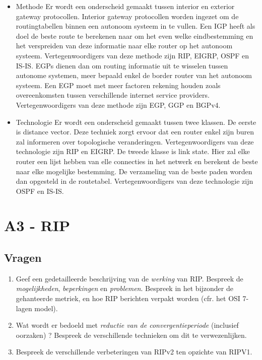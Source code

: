 \documentclass{report}
\begin{document}
\begin{enumerate}
			\begin{itemize}
				\item Methode
				\newline
				Er wordt een onderscheid gemaakt tussen interior en exterior gateway protocollen. Interior gateway protocollen worden ingezet om de routingtabellen binnen een autonoom systeem in te vullen. Een IGP heeft als doel de beste route te berekenen naar om het even welke eindbestemming en het verspreiden van deze informatie naar elke router op het autonoom systeem. Vertegenwoordigers van deze methode zijn RIP, EIGRP, OSPF en IS-IS. EGPs dienen dan om routing informatie uit te wisselen tussen autonome systemen, meer bepaald enkel de border router van het autonoom systeem. Een EGP moet met meer factoren rekening houden zoals overeenkomsten tussen verschillende internet service providers. Vertegenwoordigers van deze methode zijn EGP, GGP en BGPv4. 
				\item Technologie
				\newline
				Er wordt een onderscheid gemaakt tussen twee klassen. De eerste is distance vector. Deze techniek zorgt ervoor dat een router enkel zijn buren zal informeren over topologische veranderingen. Vertegenwoordigers van deze technologie zijn RIP en EIGRP. De tweede klasse is link state. Hier zal elke router een lijst hebben van elle connecties in het netwerk en berekent de beste naar elke mogelijke bestemming. De verzameling van de beste paden worden dan opgesteld in de routetabel. Vertegenwoordigers van deze technologie zijn OSPF en IS-IS.
			\end{itemize}
	
	
\end{enumerate}



\newpage
\section{A3 - RIP}
\subsection{Vragen}
\begin{enumerate}
	\item Geef een gedetailleerde beschrijving van de \textit{werking} van RIP. Bespreek de \textit{mogelijkheden}, \textit{beperkingen} en \textit{problemen}. Bespreek in het bijzonder de gehanteerde metriek, en hoe RIP berichten verpakt worden (cfr. het OSI 7-lagen model).
	\item Wat wordt er bedoeld met \textit{reductie van de convergentieperiode} (inclusief oorzaken) ? Bespreek de verschillende technieken om dit te verwezenlijken.
	\item Bespreek de verschillende verbeteringen van RIPv2 ten opzichte van RIPV1.
\end{enumerate}
\end{document}
